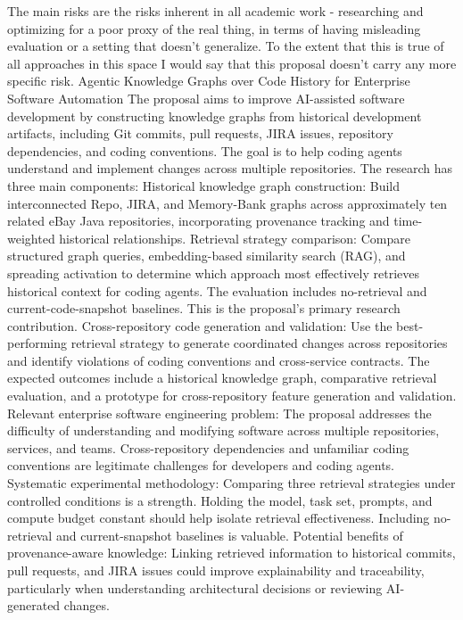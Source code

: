 The main risks are the risks inherent in all academic work - researching and optimizing for a poor proxy of the real thing, in terms of having misleading evaluation or a setting that doesn't generalize. To the extent that this is true of all approaches in this space I would say that this proposal doesn't carry any more specific risk.
Agentic Knowledge Graphs over Code History for Enterprise Software Automation
The proposal aims to improve AI-assisted software development by constructing knowledge graphs from historical development artifacts, including Git commits, pull requests, JIRA issues, repository dependencies, and coding conventions. The goal is to help coding agents understand and implement changes across multiple repositories.
The research has three main components:
Historical knowledge graph construction: Build interconnected Repo, JIRA, and Memory-Bank graphs across approximately ten related eBay Java repositories, incorporating provenance tracking and time-weighted historical relationships.
Retrieval strategy comparison: Compare structured graph queries, embedding-based similarity search (RAG), and spreading activation to determine which approach most effectively retrieves historical context for coding agents. The evaluation includes no-retrieval and current-code-snapshot baselines. This is the proposal's primary research contribution.
Cross-repository code generation and validation: Use the best-performing retrieval strategy to generate coordinated changes across repositories and identify violations of coding conventions and cross-service contracts.
The expected outcomes include a historical knowledge graph, comparative retrieval evaluation, and a prototype for cross-repository feature generation and validation.
Relevant enterprise software engineering problem: The proposal addresses the difficulty of understanding and modifying software across multiple repositories, services, and teams. Cross-repository dependencies and unfamiliar coding conventions are legitimate challenges for developers and coding agents.
Systematic experimental methodology: Comparing three retrieval strategies under controlled conditions is a strength. Holding the model, task set, prompts, and compute budget constant should help isolate retrieval effectiveness. Including no-retrieval and current-snapshot baselines is valuable.
Potential benefits of provenance-aware knowledge: Linking retrieved information to historical commits, pull requests, and JIRA issues could improve explainability and traceability, particularly when understanding architectural decisions or reviewing AI-generated changes.
